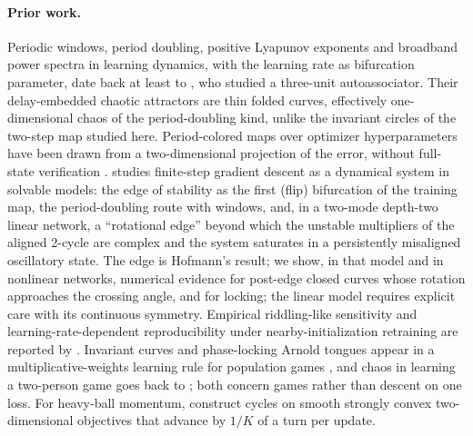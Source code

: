 \documentclass[11pt,letterpaper]{article}
\begin{document}
\paragraph{Prior work.} Periodic windows, period doubling, positive Lyapunov exponents and broadband power
spectra in learning dynamics, with the learning rate as bifurcation parameter, date back at least to
\citet{vandermaas1990}, who studied a three-unit autoassociator. Their delay-embedded chaotic attractors are thin
folded curves, effectively one-dimensional chaos of the period-doubling kind, unlike the invariant circles of the
two-step map studied here. Period-colored maps over optimizer hyperparameters have been drawn from a
two-dimensional projection of the error, without full-state verification \citep{sveleba2026}. \citet{hofmann2026}
studies finite-step gradient descent as a dynamical system in solvable models: the edge of stability as the first
(flip) bifurcation of the training map, the period-doubling route with windows, and, in a two-mode depth-two linear
network, a ``rotational edge'' beyond which the unstable multipliers of the aligned 2-cycle are complex and the
system saturates in a persistently misaligned oscillatory state. The edge is Hofmann's result; we show, in that
model and in nonlinear networks, numerical evidence for post-edge closed curves whose rotation approaches
the crossing angle, and for locking; the linear model requires explicit care with its continuous symmetry.
Empirical riddling-like sensitivity and learning-rate-dependent reproducibility under nearby-initialization
retraining are reported by \citet{ly2025}. Invariant curves and phase-locking Arnold tongues appear in a
multiplicative-weights learning rule for population games \citep{metaxas2026}, and chaos in learning a two-person
game goes back to \citet{sato2002}; both concern games rather than descent on one loss. For heavy-ball momentum, \citet{goujaud2025} construct
cycles on smooth strongly convex two-dimensional objectives that advance by $1/K$ of a turn per update.
\end{document}
